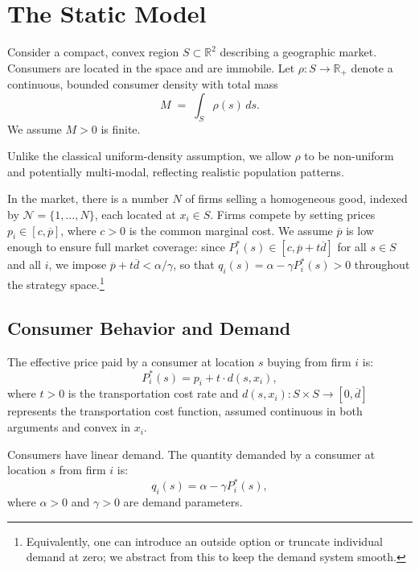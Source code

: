 \documentclass{article}
\begin{document}
\section{The Static Model}
\label{sec:static_model}

Consider a compact, convex region $S \subset \mathbb{R}^2$ describing a geographic market. Consumers are located in the space and are immobile. Let $\rho: S\to \mathbb{R}_+$ denote a continuous, bounded consumer density with total mass
\[
  M \;=\; \int_S \rho(s)\,ds.
\]
We assume $M>0$ is finite.

\begin{remark}
  Unlike the classical uniform-density assumption, we allow $\rho$ to be non-uniform and potentially multi-modal, reflecting realistic population patterns.
\end{remark}

In the market, there is a number $N$ of firms selling a homogeneous good, indexed by $\mathcal{N}=\{1,\dots,N\}$, each located at $x_i \in S$. Firms compete by setting prices $p_i \in [c,\overline{p}]$, where $c>0$ is the common marginal cost. We assume $\overline{p}$ is low enough to ensure full market coverage: since $P_i^*(s)\in[c,\overline{p}+t\overline{d}]$ for all $s\in S$ and all $i$, we impose $\overline{p}+t\overline{d}<\alpha/\gamma$, so that $q_i(s)=\alpha-\gamma P_i^*(s)>0$ throughout the strategy space.\footnote{Equivalently, one can introduce an outside option or truncate individual demand at zero; we abstract from this to keep the demand system smooth.}

\subsection*{Consumer Behavior and Demand}

The effective price paid by a consumer at location $s$ buying from firm $i$ is:
\begin{equation}
  P_i^*(s) = p_i + t \cdot d(s,x_i),
  \label{eq:effective_price}
\end{equation}
where $t>0$ is the transportation cost rate and $d(s,x_i): S \times S \to [0, \overline{d}]$ represents the transportation cost function, assumed continuous in both arguments and convex in $x_i$.

Consumers have linear demand. The quantity demanded by a consumer at location $s$ from firm $i$ is:
\begin{equation}
  q_i(s) = \alpha - \gamma P_i^*(s),
\end{equation}
where $\alpha > 0$ and $\gamma > 0$ are demand parameters.
\end{document}
